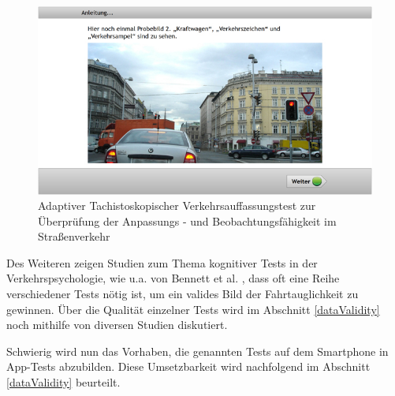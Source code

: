 \begin{figure}[H]
\centering
\includegraphics[width=\linewidth]{images/atavt}
\caption[Caption for parameters]{Adaptiver Tachistoskopischer Verkehrsauffassungstest zur Überprüfung der Anpassungs - und Beobachtungsfähigkeit im Straßenverkehr \footnotemark}
\label{fig:atavt}
\end{figure}

Des Weiteren zeigen Studien zum Thema kognitiver Tests in der Verkehrspsychologie, wie u.a. von Bennett et al. \cite{cognitivetestsfitnesstodrive}, dass oft eine Reihe verschiedener Tests nötig ist, um ein valides Bild der Fahrtauglichkeit zu gewinnen. Über die Qualität einzelner Tests wird im Abschnitt \ref{dataValidity} noch mithilfe von diversen Studien diskutiert.

Schwierig wird nun das Vorhaben, die genannten Tests auf dem Smartphone in App-Tests abzubilden. Diese Umsetzbarkeit wird nachfolgend im Abschnitt \ref{dataValidity} beurteilt.

